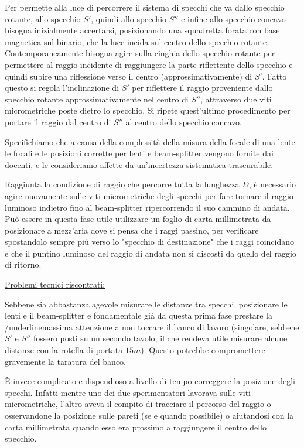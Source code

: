 \documentclass{article}
\begin{document}
Per permette alla luce di percorrere il sistema di specchi che va dallo specchio rotante, allo specchio $S'$, quindi allo specchio $S''$ e infine allo specchio concavo 
bisogna inizialmente accertarsi, posizionando una squadretta forata con base magnetica sul binario, che la luce incida sul centro dello specchio rotante.
Contemporaneamente bisogna agire sulla cinghia dello specchio rotante per permettere al raggio incidente di raggiungere la parte riflettente dello specchio e quindi 
subire una riflessione verso il centro (approssimativamente) di $S'$.
Fatto questo si regola l'inclinazione di $S'$ per riflettere il raggio proveniente dallo specchio rotante approssimativamente nel centro di $S''$, attraverso due
viti micrometriche poste dietro lo specchio. Si ripete quest'ultimo procedimento per portare il raggio dal centro di $S''$ al centro dello specchio concavo.

Specifichiamo che a causa della complessità della misura della focale di una lente le focali e le posizioni corrette per lenti e beam-splitter vengono fornite dai 
docenti, e le consideriamo affette da un'incertezza sistematica trascurabile.

\vspace{3mm}

Raggiunta la condizione di raggio che percorre tutta la lunghezza $D$, è necessario agire nuovamente sulle viti micrometriche degli specchi per fare tornare il raggio
luminoso indietro fino al beam-splitter ripercorrendo il suo cammino di andata. Può essere in questa fase utile utilizzare un foglio di carta millimetrata da posizionare
a mezz'aria dove si pensa che i raggi passino, per verificare spostandolo sempre più verso lo "specchio di destinazione" che i raggi coincidano e che il puntino luminoso
del raggio di andata non si discosti da quello del raggio di ritorno.

\vspace{3mm}

\underline{Problemi tecnici riscontrati:} 

Sebbene sia abbastanza agevole misurare le distanze tra specchi, posizionare le lenti e il beam-splitter e fondamentale già da questa prima fase prestare la 
/underline{massima attenzione} a non toccare il banco di lavoro (singolare, sebbene $S'$ e $S''$ fossero posti su un secondo tavolo, il che rendeva utile misurare alcune
distanze con la rotella di portata $15m$). 
Questo potrebbe compromettere gravemente la taratura del banco.

È invece complicato e dispendioso a livello di tempo correggere la posizione degli specchi. Infatti mentre uno dei due sperimentatori lavorava sulle viti micrometriche,
l'altro aveva il compito di tracciare il percorso del raggio o osservandone la posizione sulle pareti (se e quando possibile) o aiutandosi con la carta millimetrata 
quando esso era prossimo a raggiungere il centro dello specchio.
\end{document}
